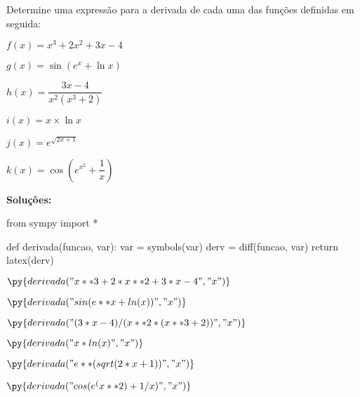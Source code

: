 \documentclass[11pt, a4paper]{article}
\begin{document}
	\begin{itens}
        \item Determine uma expressão para a derivada de cada uma das funções definidas em seguida:
        
        \begin{multicols}{2}
        	\begin{itens}
        		\item \(f\left(x\right)=x^3+2x^2+3x-4\)
        		\item \(g\left(x\right)=\sin\left(e^x+\ln x\right)\)
        		\item \(h\left(x\right)=\dfrac{3x-4}{x^2\left(x^3+2\right)}\)
        		\item \(i\left(x\right)=x\times\ln x\)
        		\item \(j\left(x\right)=e^{\sqrt{2x+1}}\)
        		\item \(k\left(x\right)=\cos\left(e^{x^2}+\dfrac{1}{x}\right)\)
        	\end{itens}
        \end{multicols}
    \end{itens}
	
	\textbf {Soluções:}
	
	\begin{pycode}
from sympy import *

def derivada(funcao, var):
	var = symbols(var)
	derv = diff(funcao, var)
	return latex(derv)
	\end{pycode}
	
	\begin{itens}
		\item \hfil
		\begin{itens}
			\begin{multicols}{2}
				\item \(\py{derivada("x**3+2*x**2+3*x-4", "x")}\)
				\item \(\py{derivada("sin(e**x+ln(x))", "x")}\)
				\item \(\py{derivada("(3*x-4)/(x**2 * (x**3+2))", "x")}\)
				\item \(\py{derivada("x*ln(x)", "x")}\)
				\item \(\py{derivada("e**(sqrt(2*x+1))", "x")}\)
				\item \(\py{derivada("cos(e^(x**2)+1/x)", "x")}\)
			\end{multicols}
		\end{itens}
	\end{itens}
\end{document}

